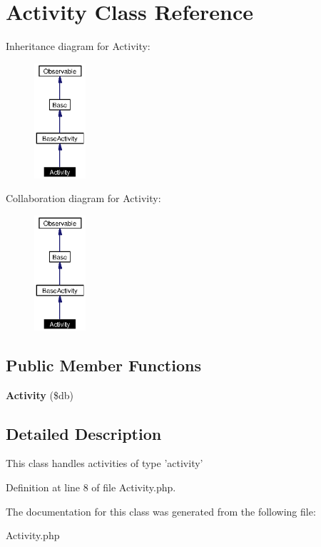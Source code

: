 \section{Activity Class Reference}
\label{classActivity}
Inheritance diagram for Activity:\begin{figure}[H]
\begin{center}
\leavevmode
\includegraphics[width=54pt]{classActivity__inherit__graph}
\end{center}
\end{figure}
Collaboration diagram for Activity:\begin{figure}[H]
\begin{center}
\leavevmode
\includegraphics[width=54pt]{classActivity__coll__graph}
\end{center}
\end{figure}
\subsection*{Public Member Functions}
\begin{CompactItemize}
\item 
{\bf Activity} (\$db)\label{classActivity_a0}

\end{CompactItemize}


\subsection{Detailed Description}
This class handles activities of type 'activity' 



Definition at line 8 of file Activity.php.

The documentation for this class was generated from the following file:\begin{CompactItemize}
\item 
Activity.php\end{CompactItemize}
